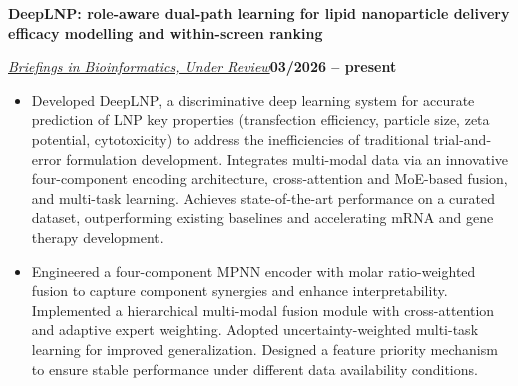 \documentclass[10pt,a4paper]{article}
\newcommand{\titleline}[1]{\par\vspace{0.80bp}\noindent\textbf{#1}\par\vspace{0.50bp}}
\newcommand{\metaline}[2]{%
  \par\noindent\uline{\textit{#1}}\hfill\textbf{#2}\par\vspace{0.50bp}%
}
\let\venueline\metaline
\newenvironment{cvitems}{%
  \begin{itemize}[leftmargin=14.20bp,labelwidth=4.20bp,labelsep=10.00bp,align=left,
    topsep=0bp,itemsep=0bp,parsep=0bp,partopsep=0bp,label={\textbullet}]
}{\end{itemize}}
\begin{document}
\titleline{DeepLNP: role-aware dual-path learning for lipid nanoparticle delivery efficacy modelling and within-screen ranking}
\venueline{Briefings in Bioinformatics, Under Review}{03/2026 -- present}
\begin{cvitems}
\item Developed DeepLNP, a discriminative deep learning system for accurate prediction of LNP key properties (transfection efficiency, particle size, zeta potential, cytotoxicity) to address the inefficiencies of traditional trial-and-error formulation development. Integrates multi-modal data via an innovative four-component encoding architecture, cross-attention and MoE-based fusion, and multi-task learning. Achieves state-of-the-art performance on a curated dataset, outperforming existing baselines and accelerating mRNA and gene therapy development.
\item Engineered a four-component MPNN encoder with molar ratio-weighted fusion to capture component synergies and enhance interpretability. Implemented a hierarchical multi-modal fusion module with cross-attention and adaptive expert weighting. Adopted uncertainty-weighted multi-task learning for improved generalization. Designed a feature priority mechanism to ensure stable performance under different data availability conditions.
\end{cvitems}
\end{document}
